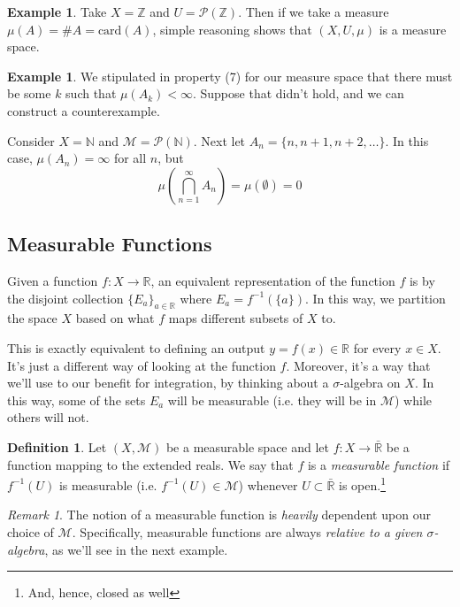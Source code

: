 \documentclass[12pt]{article}
\theoremstyle{plain}
\theoremstyle{definition}
\newtheorem{defn}[thm]{Definition}
\newtheorem{ex}[thm]{Example}
\theoremstyle{remark}
\newtheorem*{rmk}{Remark}
\begin{document}
\begin{ex}
    Take $X=\mathbb{Z}$ and $U=\mathscr{P}(\mathbb{Z})$. Then if we take a measure $\mu(A) = \#A = \text{card}\left( A \right)$, simple reasoning shows that $(X,U,\mu)$ is a measure space.
\end{ex}

\begin{ex}
    We stipulated in property (7) for our measure space that there must be some $k$ such that $\mu(A_k)<\infty$. Suppose that didn't hold, and we can construct a counterexample. 
    
    Consider $X = \mathbb{N}$ and $\mathscr{M} =\mathscr{P}(\mathbb{N})$. Next let $A_n = \{n, n+1, n+2, \ldots\}$. In this case, $\mu(A_n) = \infty$ for all $n$, but
    \[ 
        \mu\left(\bigcap^\infty_{n=1} A_n\right) = 
        \mu(\emptyset) = 0
    \]
\end{ex}

\subsection{Measurable Functions}


Given a function $f:X\rightarrow\mathbb{R}$, an equivalent representation of the function $f$ is by the disjoint collection $\{E_a\}_{a\in\mathbb{R}}$ where $E_a = f^{-1}\left(\{a\}\right)$. In this way, we partition the space $X$ based on what $f$ maps different subsets of $X$ to.  

This is exactly equivalent to defining an output $y=f(x)\in\mathbb{R}$ for every $x\in X$.  It's just a different way of looking at the function $f$. Moreover, it's a way that we'll use to our benefit for integration, by thinking about a $\sigma$-algebra on $X$. In this way, some of the sets $E_a$ will be measurable (i.e. they will be in $\mathscr{M}$) while others will not.

\begin{defn}
Let $(X,\mathscr{M})$ be a measurable space and let $f:X\rightarrow\bar{\mathbb{R}}$ be a function mapping to the extended reals. We say that $f$ is a \emph{measurable function} if $f^{-1}(U)$ is measurable (i.e.  $f^{-1}(U)\in\mathscr{M}$) whenever $U\subset\bar{\mathbb{R}}$ is open.\footnote{And, hence, closed as well} 
\end{defn}

\begin{rmk}
The notion of a measurable function is \emph{heavily} dependent upon our choice of $\mathscr{M}$.  Specifically, measurable functions are always \emph{relative to a given $\sigma$-algebra}, as we'll see in the next example.
\end{rmk}
\end{document}
